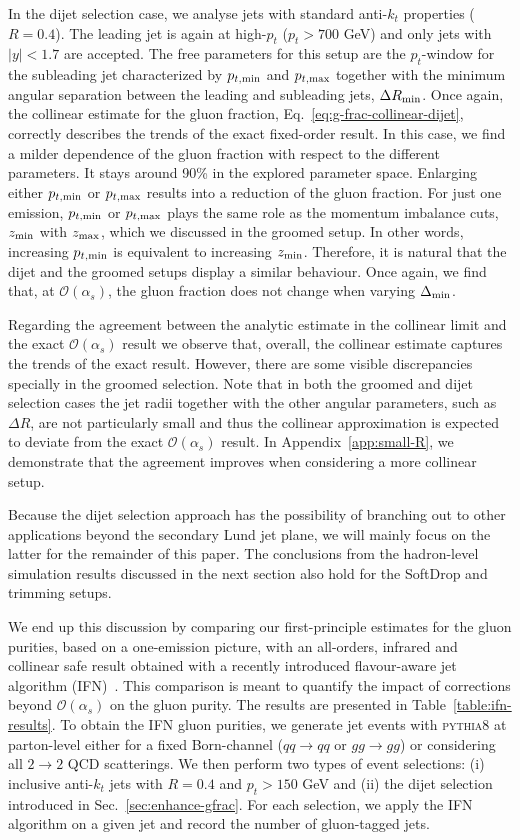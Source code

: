 \documentclass[a4paper,11pt]{article}
\newcommand{\zmin}{z_{\rm{min}}}
\newcommand{\zmax}{z_{\rm{max}}}
\newcommand{\ptmin}{p_{t,\rm{min}}}
\newcommand{\ptmax}{p_{t,\rm{max}}}
\newcommand{\py}{{\textsc{pythia}}8\xspace}
\begin{document}
In the dijet selection case, we analyse jets with standard anti-$k_t$ properties ($R=0.4$). The leading jet is again at high-$p_t$ ($p_t> 700$ GeV) and only jets with $|y|<1.7$ are accepted. The free parameters for this setup are the $p_t$-window for the subleading jet characterized by $\ptmin$ and $\ptmax$ together with the minimum angular separation between the leading and subleading jets, $\Delta R_{\rm min}$. Once again, the collinear estimate for the gluon fraction, Eq.~\eqref{eq:g-frac-collinear-dijet}, correctly describes the trends of the exact fixed-order result. In this case, we find a milder dependence of the gluon fraction with respect to the different parameters. It stays around 90\% in the explored parameter space. Enlarging either $\ptmin$ or $\ptmax$ results into a reduction of the gluon fraction. For just one emission, $\ptmin$ or $\ptmax$ plays the same role as the momentum imbalance cuts, $\zmin$ with $\zmax$, which we discussed in the groomed setup. In other words, increasing $\ptmin$ is equivalent to increasing $\zmin$. Therefore, it is natural that the dijet and the groomed setups display a similar behaviour. Once again, we find that, at $\mathcal{O}(\alpha_s)$, the gluon fraction does not change when varying $\Delta_{\rm min}$.   

Regarding the agreement between the analytic estimate in the collinear limit and the exact $\mathcal{O}(\alpha_s)$ result we observe that, overall, the collinear estimate captures the trends of the exact result. However, there are some visible discrepancies specially in the groomed selection. Note that in both the groomed and dijet selection cases the jet radii together with the other angular parameters, such as $\Delta R$, are not particularly small and thus the collinear approximation is expected to deviate from the exact $\mathcal{O}(\alpha_s)$ result. In Appendix~\ref{app:small-R}, we demonstrate that the agreement improves when considering a more collinear setup.

Because the dijet selection approach has the possibility of branching out to other applications beyond the secondary Lund jet plane, we will mainly focus on the latter for the remainder of this paper. The conclusions from the hadron-level simulation results discussed in the next section also hold for the SoftDrop and trimming setups. 

 We end up this discussion by comparing our first-principle estimates for the gluon purities, based on a one-emission picture, with an all-orders, infrared and collinear safe result obtained with a recently introduced flavour-aware jet algorithm (IFN)~\cite{Caola:2023wpj}. This comparison is meant to quantify the impact of corrections beyond $\mathcal{O}(\alpha_s)$ on the gluon purity. The results are presented in Table~\ref{table:ifn-results}. To obtain the IFN gluon purities, we generate jet events with \py at parton-level either for a fixed Born-channel ($qq\to qq$ or $gg\to gg$) or considering all $2\to 2$ QCD scatterings. We then perform two types of event selections: (i) inclusive anti-$k_t$ jets with $R=0.4$ and $p_t>150$ GeV and (ii) the dijet selection introduced in Sec.~\ref{sec:enhance-gfrac}. For each selection, we apply the IFN algorithm on a given jet and record the number of gluon-tagged jets. 
\end{document}
